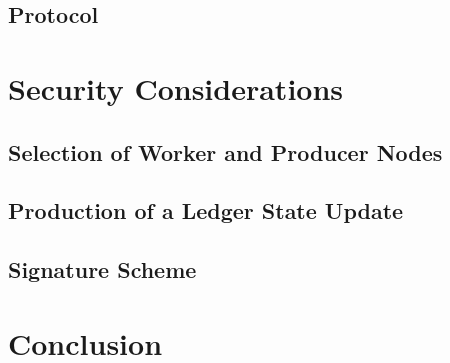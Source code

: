 \documentclass[a4paper, 12pt]{book}
\begin{document}


\section{Protocol}\label{Sec:Dem}





%



%


\chapter{Security Considerations} \label{Cha:Sec}




\section{Selection of Worker and Producer Nodes}\label{Sec:ConSec}



\section{Production of a Ledger State Update}\label{Sec:SecLsu}




\section{Signature Scheme}\label{Sec:SSS}





\chapter*{Conclusion} \label{Cha:Con}




\begin{raggedright}
\normalem
\printbibliography

\end{raggedright}
\end{document}
